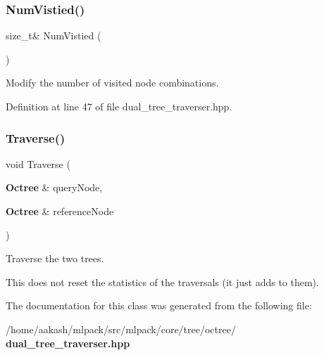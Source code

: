 \subsubsection{Num\+Vistied()}
{\footnotesize\ttfamily size\+\_\+t\& Num\+Vistied (\begin{DoxyParamCaption}{ }\end{DoxyParamCaption})\hspace{0.3cm}{\ttfamily [inline]}}



Modify the number of visited node combinations. 



Definition at line 47 of file dual\+\_\+tree\+\_\+traverser.\+hpp.

\mbox{\label{classmlpack_1_1tree_1_1Octree_1_1DualTreeTraverser_ab4a6e08644fedca8d9a2cf0e7a2a237c}} 
\subsubsection{Traverse()}
{\footnotesize\ttfamily void Traverse (\begin{DoxyParamCaption}\item[{\textbf{ Octree} \&}]{query\+Node,  }\item[{\textbf{ Octree} \&}]{reference\+Node }\end{DoxyParamCaption})}



Traverse the two trees. 

This does not reset the statistics of the traversals (it just adds to them). 

The documentation for this class was generated from the following file\+:\begin{DoxyCompactItemize}
\item 
/home/aakash/mlpack/src/mlpack/core/tree/octree/\textbf{ dual\+\_\+tree\+\_\+traverser.\+hpp}\end{DoxyCompactItemize}

